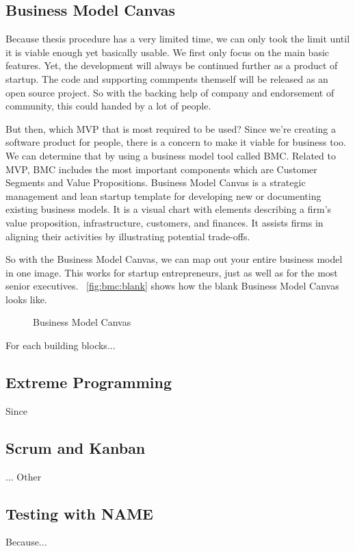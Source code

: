 \subsection{Business Model Canvas}

Because thesis procedure has a very limited time, we can only took the limit until it is viable enough yet basically usable.
We first only focus on the main basic features.
Yet, the development will always be continued further as a product of startup.
The code and supporting commpents themself will be released as an open source project.
So with the backing help of company and endorsement of community, this could handed by a lot of people.

But then, which \ac{MVP} that is most required to be used?
Since we're creating a software product for people, there is a concern to make it viable for business too.
We can determine that by using a business model tool called \ac{BMC}.
Related to \ac{MVP}, \ac{BMC} includes the most important components which are Customer Segments and Value Propositions.
Business Model Canvas is a strategic management and lean startup template for developing new or documenting existing business models.
It is a visual chart with elements describing a firm's value proposition, infrastructure, customers, and finances.
It assists firms in aligning their activities by illustrating potential trade-offs.

So with the Business Model Canvas, we can map out your entire business model in one image.
This works for startup entrepreneurs, just as well as for the most senior executives.~\autocite{Strategyzer2011BMC}
\autoref{fig:bmc:blank} shows how the blank Business Model Canvas looks like.

\begin{figure}[htbp]
    \centering
    \caption{Business Model Canvas}
    \label{fig:bmc:blank}
\end{figure}

For each building blocks...

\subsection{Extreme Programming}

Since


\subsection{Scrum and Kanban}

...
Other


\subsection{Testing with NAME}

Because...


